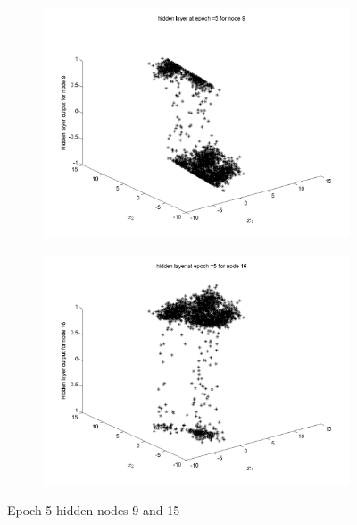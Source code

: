 \documentclass{article}
\begin{document}
\begin{figure}
\begin{subfigure}{.5\textwidth}
  \centering
  \includegraphics[width=.8\linewidth]{Classification/overlapping/h5_9}
 
\end{subfigure}%
\begin{subfigure}{.5\textwidth}
  \centering
  \includegraphics[width=.8\linewidth]{Classification/overlapping/h5_15}
  \end{subfigure}
\caption{Epoch 5 hidden nodes 9 and 15}
\end{figure}
\end{document}
